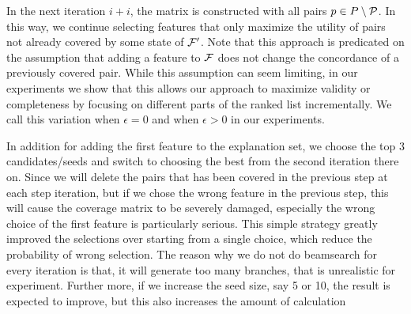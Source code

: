 In the next iteration $i+i$, the matrix is constructed with all pairs $p \in P\setminus\P$. In this way, we continue selecting features that only maximize the utility of pairs not already covered by some state of $\f'$. Note that this approach is predicated on the assumption that adding a feature to $\f$ does not change the concordance of a previously covered pair. While this assumption can seem limiting, in our experiments we show that this allows our approach to maximize validity or completeness by focusing on different parts of the ranked list incrementally. We call this variation \greedycov when $\epsilon=0$ and \greedycovep  when $\epsilon>0$ in our experiments. 

 In addition for adding the first feature to the explanation set, we choose the top 3 candidates/seeds and switch to choosing the best from the second iteration there on. Since we will delete the pairs that has been covered in the previous step at each step iteration, but if we chose the wrong feature in the previous step, this will cause the coverage matrix to be severely damaged, especially the wrong choice of the first feature is particularly serious. This simple strategy greatly improved the selections over starting from a single choice, which reduce the probability of wrong selection. The reason why we do not do beamsearch for every iteration is that, it will generate too many branches, that is unrealistic for experiment. Further more, if we increase the seed size, say 5 or 10, the result is expected to improve, but this also increases the amount of calculation


